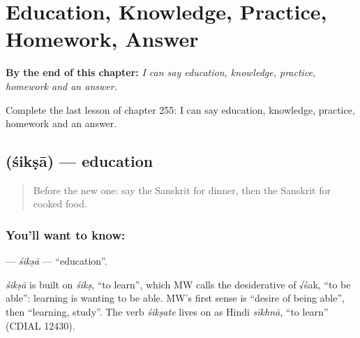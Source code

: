 
\chapter{Education, Knowledge, Practice, Homework, Answer}
\label{ch:sa-education-knowledge-practice-homework-answer}

\begin{chapteropening}
\textbf{By the end of this chapter:} \emph{I can say education, knowledge, practice, homework and an answer.}

Complete the last lesson of chapter 255: I can say education, knowledge, practice, homework and an answer.
\end{chapteropening}

\section[\texorpdfstring{\sk{शिक्षा} (śikṣā)}{शिक्षा (śikṣā)}]{ (śikṣā) — education}

\label{lesson:SA-C255-siksa}



\begin{quote}
Before the new one: say the Sanskrit for dinner, then the Sanskrit for cooked food.
\end{quote}

\subsection*{You'll want to know: }
\textbf{} — \emph{śikṣā} — \textquotedblleft{}education\textquotedblright{}.

\begin{cousinweb}
\emph{śikṣā} is built on \emph{śikṣ}, \textquotedblleft{}to learn\textquotedblright{}, which MW calls the desiderative of √śak, \textquotedblleft{}to be able\textquotedblright{}: learning is wanting to be able. MW's first sense is \textquotedblleft{}desire of being able\textquotedblright{}, then \textquotedblleft{}learning, study\textquotedblright{}. The verb \emph{śikṣate} lives on as Hindi \emph{sīkhnā}, \textquotedblleft{}to learn\textquotedblright{} (CDIAL 12430).
\end{cousinweb}

